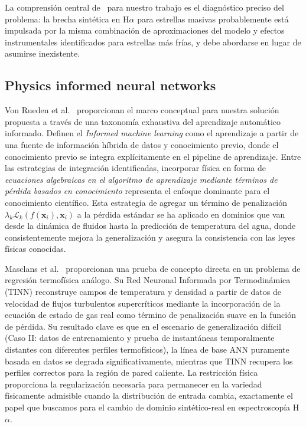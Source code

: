 \documentclass[sigconf,ACM]{acmart}
\begin{document}
La comprensión central de~\cite{OBriain2021} para nuestro trabajo es el diagnóstico preciso del problema: la brecha sintética en H$\alpha$ para estrellas masivas probablemente está impulsada por la misma combinación de aproximaciones del modelo y efectos instrumentales identificados para estrellas más frías, y debe abordarse en lugar de asumirse inexistente.

\subsection{Physics informed neural networks}

Von Rueden et al.~\cite{vonRueden2021} proporcionan el marco conceptual para nuestra solución propuesta a través de una taxonomía exhaustiva del aprendizaje automático informado. Definen el \emph{Informed machine learning} como el aprendizaje a partir de una fuente de información híbrida de datos y conocimiento previo, donde el conocimiento previo se integra explícitamente en el pipeline de aprendizaje. Entre las estrategias de integración identificadas, incorporar física en forma de \emph{ecuaciones algebraicas en el algoritmo de aprendizaje mediante términos de pérdida basados en conocimiento} representa el enfoque dominante para el conocimiento científico. Esta estrategia de agregar un término de penalización $\lambda_k \mathcal{L}_k(f(\mathbf{x}_i), \mathbf{x}_i)$ a la pérdida estándar se ha aplicado en dominios que van desde la dinámica de fluidos hasta la predicción de temperatura del agua, donde consistentemente mejora la generalización y asegura la consistencia con las leyes físicas conocidas.

Masclans et al.~\cite{Masclans2023} proporcionan una prueba de concepto directa en un problema de regresión termofísica análogo. Su Red Neuronal Informada por Termodinámica (TINN) reconstruye campos de temperatura y densidad a partir de datos de velocidad de flujos turbulentos supercríticos mediante la incorporación de la ecuación de estado de gas real como término de penalización suave en la función de pérdida. Su resultado clave es que en el escenario de generalización difícil (Caso II: datos de entrenamiento y prueba de instantáneas temporalmente distantes con diferentes perfiles termofísicos), la línea de base ANN puramente basada en datos se degrada significativamente, mientras que TINN recupera los perfiles correctos para la región de pared caliente. La restricción física proporciona la regularización necesaria para permanecer en la variedad físicamente admisible cuando la distribución de entrada cambia, exactamente el papel que buscamos para el cambio de dominio sintético-real en espectroscopía
H$\alpha$.
\end{document}
